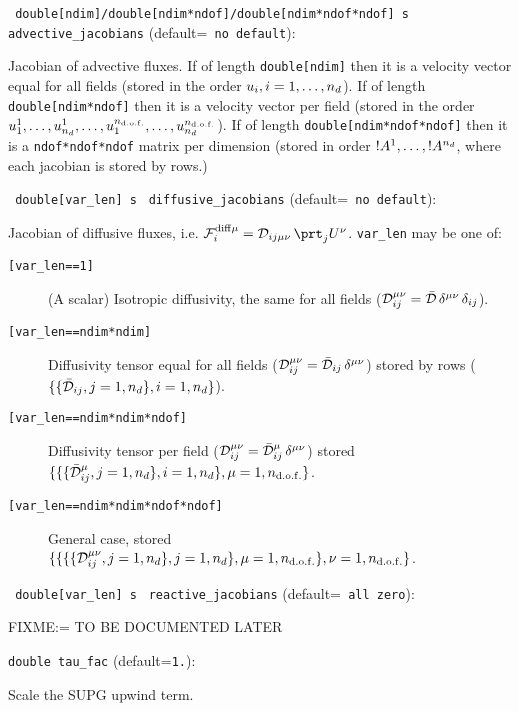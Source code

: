 \item\verb+ double[ndim]/double[ndim*ndof]/double[ndim*ndof*ndof] s+ \verb+ advective_jacobians+ {\rm(default=\verb| no default|)}:
 
Jacobian of advective fluxes. If of length \verb+double[ndim]+ then it
is a velocity vector equal for all fields (stored in the order $u_i,
i=1,\dots,{n_d}$).  If of length \verb+double[ndim*ndof]+ then it is a
velocity vector per field (stored in the order
$u^1_1,\ldots,u^1_{n_d},\ldots,u^{n_{\mathrm{d.o.f.}}}_1,\ldots,u^{n_{\mathrm{d.o.f.}}}_{n_d}$). If of
length \verb+double[ndim*ndof*ndof]+ then it is a
\verb+ndof*ndof*ndof+ matrix per dimension (stored in order
$!A^1,\ldots,!A^{n_d}$, where each jacobian is stored by rows.)
\item\verb+ double[var_len] s+ \verb+ diffusive_jacobians+ {\rm(default=\verb| no default|)}:
 
Jacobian of diffusive fluxes, i.e. 
\(\F^{\diff\mu}_i = \D_{ij\mu\nu}\, \prt_j U^\nu\). 
\verb+var_len+ may be one of:
%
\begin{description}
%
\item[{\tt [var\_len==1]}] (A scalar) Isotropic diffusivity, the same
for all fields (\(\mathcal{D}_{ij}^{\mu\nu} = \bar{\mathcal{D}} \, \delta^{\mu\nu} \,
\delta_{ij}\)).
%
\item[{\tt [var\_len==ndim*ndim]}] Diffusivity tensor
equal for all fields (\(\mathcal{D}_{ij}^{\mu\nu} = \bar{\mathcal{D}}_{ij} \,
\delta^{\mu\nu}\)) stored by rows (\(\{\{\bar{\mathcal{D}}_{ij},j=1,{n_d}\},i=1,{n_d}\}\)).
%
\item[{\tt [var\_len==ndim*ndim*ndof]}] 
Diffusivity tensor per field (\(\mathcal{D}_{ij}^{\mu\nu} = {\bar{\mathcal{D}}_{ij}^\mu} \,
\delta^{\mu\nu}\)) stored \(\{\{\{\bar{\mathcal{D}}_{ij}^\mu,j=1,{n_d}\},i=1,{n_d}\},\mu=1,{n_{\mathrm{d.o.f.}}}\}\).
%
\item[{\tt [var\_len==ndim*ndim*ndof*ndof]}] General case, stored
\(\{\{\{\{\mathcal{D}_{ij}^{\mu\nu},j=1,{n_d}\},j=1,{n_d}\},\mu=1,{n_{\mathrm{d.o.f.}}}\},\nu=1,{n_{\mathrm{d.o.f.}}}\}\).
\end{description}
\item\verb+ double[var_len] s+ \verb+ reactive_jacobians+ {\rm(default=\verb| all zero|)}:
 
 FIXME:= TO BE DOCUMENTED LATER
\item\verb+double tau_fac+ {\rm(default=\verb|1.|)}:

Scale the SUPG upwind term. 

